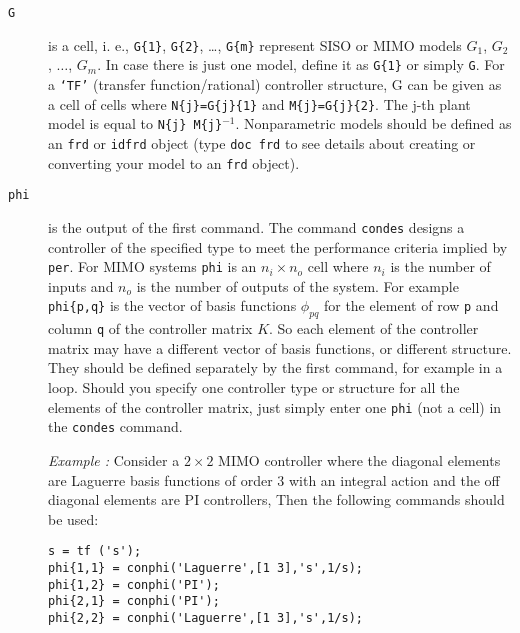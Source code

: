 \documentclass [12pt , a4paper] {report}
\begin{document}
\begin{description}
\item[\texttt{G}] is a cell, i. e., \texttt{G\{1\}}, \texttt{G\{2\}}, \dots, \texttt{G\{m\}} represent SISO or MIMO models $G_1$, $G_2$, $\ldots$, $G_m$. In case there is just one model, define it as \texttt{G\{1\}} or simply \texttt{G}.
    For a \texttt{`TF'} (transfer function/rational) controller structure, G can be given as a cell of cells where \texttt{N\{j\}=G\{j\}\{1\}} and \texttt{M\{j\}=G\{j\}\{2\}}. The j-th plant model is equal to \texttt{N\{j\} M\{j\}$^{-1}$}.
Nonparametric models should be defined as an \texttt{frd} or  \texttt{idfrd} object (type \texttt{doc frd} to see details about creating or converting your model to an \texttt{frd} object).

\item[\texttt{phi}] is the output of the first command. The command \texttt{condes} designs a controller of the specified type to meet the performance criteria implied by \texttt{per}. For MIMO systems \texttt{phi} is an $n_i \times n_o$ cell where $n_i$ is the number of inputs and $n_o$ is the number of outputs of the system. For example \texttt{phi\{p,q\}} is the vector of basis functions $\phi_{pq}$ for the element of row \texttt{p} and column \texttt{q} of the controller matrix $K$. So each element of the controller matrix may have a different vector of basis functions, or different structure. They should be defined separately by the first command, for example in a loop. Should you specify one controller type or structure for all the elements of the controller matrix, just simply enter one \texttt{phi} (not a cell) in the \texttt{condes} command. 

{\it Example :} Consider a $2 \times 2$ MIMO controller where the diagonal elements are Laguerre basis functions of order 3 with an integral action and the off diagonal elements are PI controllers, Then the following commands should be used:

\begin{lstlisting}
s = tf ('s');
phi{1,1} = conphi('Laguerre',[1 3],'s',1/s);
phi{1,2} = conphi('PI');
phi{2,1} = conphi('PI');
phi{2,2} = conphi('Laguerre',[1 3],'s',1/s);
\end{lstlisting}


\end{description}
\end{document}
